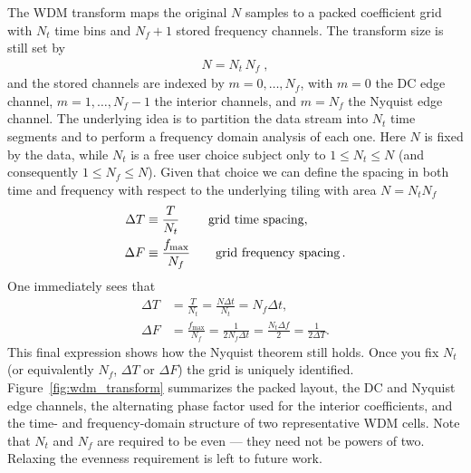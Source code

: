 \documentclass[twocolumn,preprintnumbers,
  superscriptaddress,
  nofootinbib,
  amsmath,
  amssymb,
  aps,
  prd,
  colorlinks=true,
  linkcolor=blue,
  urlcolor=blue,
  citecolor=blue,
  anchorcolor=blue
]{revtex4-2}
\begin{document}
The WDM transform maps the original $N$ samples to a packed coefficient grid with $N_t$ time bins and $N_f+1$ stored frequency channels. The transform size is still set by
\begin{align}\label{NtNf_def}
N=N_t\,N_f\;,
\end{align}
and the stored channels are indexed by $m=0,\dots,N_f$, with $m=0$ the DC edge channel, $m=1,\dots,N_f-1$ the interior channels, and $m=N_f$ the Nyquist edge channel. The underlying idea is to partition the data stream into $N_t$ time segments and to perform a frequency domain analysis of each one. Here $N$ is fixed by the data, while $N_t$ is a free user choice subject only to $1 \le N_t \le N$ (and consequently $1 \le N_f \le N$). Given that choice we can define the spacing in both time and frequency with respect to the underlying tiling with area $N = N_{t}N_{f}$
\begin{align}\label{DTDF}
  \Delta T&\equiv\frac{T}{N_t}\; \qquad \text{grid time
  spacing},\nonumber\\
  \Delta F&\equiv\frac{f_{\rm max}}{N_f} \qquad \text{grid frequency spacing}\,.
\end{align}
One immediately sees that
\begin{align}
\label{eq:timefreq-resolution}
  \Delta T &= \frac{T}{N_{t}} = \frac{N\Delta t}{N_{t}}
  = N_{f}\Delta t, \\
  \Delta F &= \frac{f_{\text{max}}}{N_{f}} = \frac{1}{2N_{f}\Delta t}=\frac{N_t\Delta f}{2} = \frac{1}{2\Delta T}.
\end{align}
This final expression shows how the Nyquist theorem still holds. Once you fix $N_t$ (or equivalently $N_f$, $\Delta T$ or $\Delta F$) the grid is uniquely identified. 
Figure~\ref{fig:wdm_transform} summarizes the packed layout, the DC and Nyquist edge channels, the alternating phase factor used for the interior coefficients, and the time- and frequency-domain structure of two representative WDM cells.
Note that $N_t$ and $N_f$ are required to be even — they need not be powers of two. Relaxing the evenness requirement is left to future work.
\end{document}
